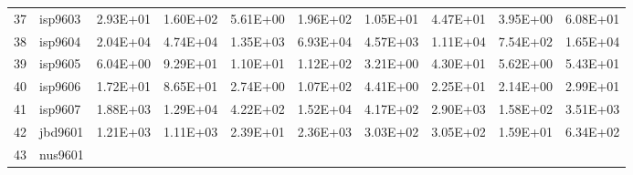 \begin{landscape}
\begin{longtable}{@{}ll*{8}{S}@{}}
37 & isp9603   & 2.93E+01 & 1.60E+02 & 5.61E+00 & 1.96E+02 & 1.05E+01 & 4.47E+01 & 3.95E+00 & 6.08E+01 \\
38 & isp9604   & 2.04E+04 & 4.74E+04 & 1.35E+03 & 6.93E+04 & 4.57E+03 & 1.11E+04 & 7.54E+02 & 1.65E+04 \\
39 & isp9605   & 6.04E+00 & 9.29E+01 & 1.10E+01 & 1.12E+02 & 3.21E+00 & 4.30E+01 & 5.62E+00 & 5.43E+01 \\
40 & isp9606   & 1.72E+01 & 8.65E+01 & 2.74E+00 & 1.07E+02 & 4.41E+00 & 2.25E+01 & 2.14E+00 & 2.99E+01 \\
41 & isp9607   & 1.88E+03 & 1.29E+04 & 4.22E+02 & 1.52E+04 & 4.17E+02 & 2.90E+03 & 1.58E+02 & 3.51E+03 \\
42 & jbd9601   & 1.21E+03 & 1.11E+03 & 2.39E+01 & 2.36E+03 & 3.03E+02 & 3.05E+02 & 1.59E+01 & 6.34E+02 \\
43 & nus9601   &          &          &          &          &          &          &          &          \\* \bottomrule
\end{longtable}
\end{landscape}